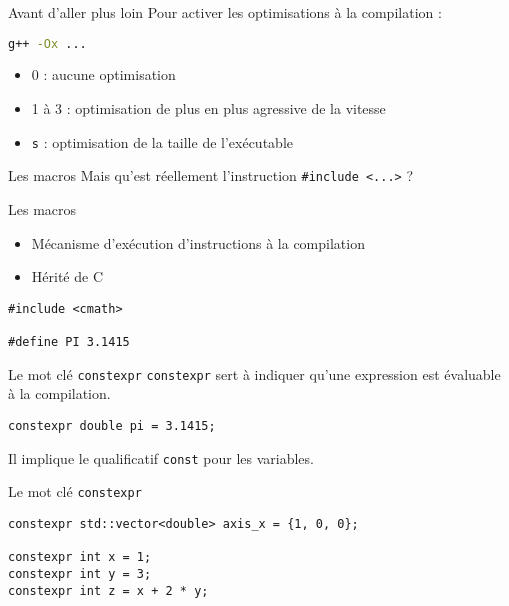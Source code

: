 
\begin{frame}[fragile]{Avant d'aller plus loin}
  Pour activer les optimisations à la compilation :
  \begin{lstlisting}[language=bash]
g++ -Ox ...
  \end{lstlisting}

  \begin{itemize}
    \item 0 : aucune optimisation
    \item 1 à 3 : optimisation de plus en plus agressive de la vitesse
    \item \texttt{s} : optimisation de la taille de l'exécutable
  \end{itemize}
\end{frame}

\begin{frame}{Les macros}
  Mais qu'est réellement l'instruction \texttt{\#include <...>} ?
\end{frame}

\begin{frame}[fragile]{Les macros}
  \begin{itemize}
    \item Mécanisme d'exécution d'instructions à la compilation
    \item Hérité de C
  \end{itemize}

  \begin{lstlisting}
#include <cmath>

#define PI 3.1415
  \end{lstlisting}
\end{frame}

\begin{frame}[fragile]{Le mot clé \texttt{constexpr}}
  \texttt{constexpr} sert à indiquer qu'une expression est évaluable à la compilation.

  \begin{lstlisting}
constexpr double pi = 3.1415;
  \end{lstlisting}

  Il implique le qualificatif \texttt{const} pour les variables.  
\end{frame}

\begin{frame}[fragile]{Le mot clé \texttt{constexpr}}
  \begin{lstlisting}
constexpr std::vector<double> axis_x = {1, 0, 0};

constexpr int x = 1;
constexpr int y = 3;
constexpr int z = x + 2 * y;
  \end{lstlisting}
\end{frame}

